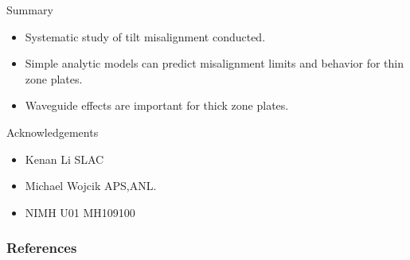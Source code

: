 \documentclass{beamer}
\begin{document}
\begin{frame}{Summary}
	\begin{itemize}
		\item Systematic study of tilt misalignment conducted.
		\item Simple analytic models can predict misalignment limits and behavior for thin zone plates.
		\item Waveguide effects are important for thick zone plates.
	\end{itemize}
\end{frame}


\begin{frame}{Acknowledgements}
  \begin{itemize}
  \item \alert{Kenan Li} SLAC
  \item \alert{Michael Wojcik} APS,ANL.
  \item \alert{NIMH} U01 MH109100
  \end{itemize}
\end{frame}



\renewcommand*{\bibfont}{\scriptsize}
\begin{frame}[t, allowframebreaks]
\frametitle{References}


\end{frame}
\end{document}
